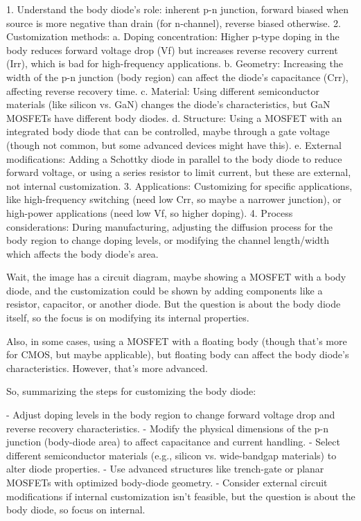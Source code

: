 1. Understand the body diode's role: inherent p-n junction, forward biased when source is more negative than drain (for n-channel), reverse biased otherwise.
2. Customization methods:
   a. Doping concentration: Higher p-type doping in the body reduces forward voltage drop (Vf) but increases reverse recovery current (Irr), which is bad for high-frequency applications.
   b. Geometry: Increasing the width of the p-n junction (body region) can affect the diode's capacitance (Crr), affecting reverse recovery time.
   c. Material: Using different semiconductor materials (like silicon vs. GaN) changes the diode's characteristics, but GaN MOSFETs have different body diodes.
   d. Structure: Using a MOSFET with an integrated body diode that can be controlled, maybe through a gate voltage (though not common, but some advanced devices might have this).
   e. External modifications: Adding a Schottky diode in parallel to the body diode to reduce forward voltage, or using a series resistor to limit current, but these are external, not internal customization.
3. Applications: Customizing for specific applications, like high-frequency switching (need low Crr, so maybe a narrower junction), or high-power applications (need low Vf, so higher doping).
4. Process considerations: During manufacturing, adjusting the diffusion process for the body region to change doping levels, or modifying the channel length/width which affects the body diode's area.

Wait, the image has a circuit diagram, maybe showing a MOSFET with a body diode, and the customization could be shown by adding components like a resistor, capacitor, or another diode. But the question is about the body diode itself, so the focus is on modifying its internal properties.

Also, in some cases, using a MOSFET with a floating body (though that's more for CMOS, but maybe applicable), but floating body can affect the body diode's characteristics. However, that's more advanced.

So, summarizing the steps for customizing the body diode:

- Adjust doping levels in the body region to change forward voltage drop and reverse recovery characteristics.
- Modify the physical dimensions of the p-n junction (body-diode area) to affect capacitance and current handling.
- Select different semiconductor materials (e.g., silicon vs. wide-bandgap materials) to alter diode properties.
- Use advanced structures like trench-gate or planar MOSFETs with optimized body-diode geometry.
- Consider external circuit modifications if internal customization isn't feasible, but the question is about the body diode, so focus on internal.

